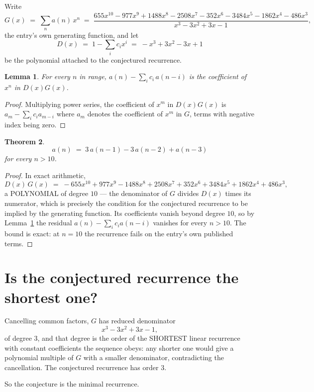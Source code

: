 \documentclass[11pt,a4paper]{article}
\theoremstyle{plain}
\newtheorem{theorem}{Theorem}
\newtheorem{lemma}[theorem]{Lemma}
\theoremstyle{definition}
\begin{document}
Write
\[
G(x)\;=\;\sum_{n}a(n)\,x^{n}\;=\;\frac{655 x^{10} - 977 x^{9} + 1488 x^{8} - 2508 x^{7} - 352 x^{6} - 3484 x^{5} - 1862 x^{4} - 486 x^{3}}{x^{3} - 3 x^{2} + 3 x - 1},
\]
the entry's own generating function, and let
\[
D(x)\;=\;1-\sum_i c_i x^{i}\;=\;- x^{3} + 3 x^{2} - 3 x + 1
\]
be the polynomial attached to the conjectured recurrence.

\begin{lemma}\label{lem:key}
For every $n$ in range, $a(n)-\sum_i c_i\,a(n-i)$ is the coefficient of $x^{n}$ in
$D(x)G(x)$.
\end{lemma}

\begin{proof}
Multiplying power series, the coefficient of $x^{m}$ in $D(x)G(x)$ is
$a_m-\sum_i c_i a_{m-i}$ where $a_m$ denotes the coefficient of $x^{m}$ in $G$, terms with
negative index being zero.
\end{proof}

\begin{theorem}
\[
a(n)\;=\;3\,a(n-1) - 3\,a(n-2) + a(n-3)
\]
for every $n>10$.
\end{theorem}

\begin{proof}
In exact arithmetic,
\[
D(x)\,G(x)\;=\;- 655 x^{10} + 977 x^{9} - 1488 x^{8} + 2508 x^{7} + 352 x^{6} + 3484 x^{5} + 1862 x^{4} + 486 x^{3},
\]
a POLYNOMIAL of degree $10$ --- the denominator of $G$ divides $D(x)$ times its numerator,
which is precisely the condition for the conjectured recurrence to be implied by the
generating function. Its coefficients vanish beyond degree $10$, so by
Lemma~\ref{lem:key} the residual $a(n)-\sum_ic_ia(n-i)$ vanishes for every
$n>10$. The bound is exact: at $n=10$ the recurrence fails on the entry's own published terms.
\end{proof}

\section{Is the conjectured recurrence the shortest one?}

Cancelling common factors, $G$ has reduced denominator
\[
x^{3} - 3 x^{2} + 3 x - 1,
\]
of degree $3$, and that degree is the order of the SHORTEST linear recurrence with
constant coefficients the sequence obeys: any shorter one would give a polynomial multiple of
$G$ with a smaller denominator, contradicting the cancellation. The conjectured recurrence has
order $3$.

So the conjecture is the minimal recurrence.
\end{document}
